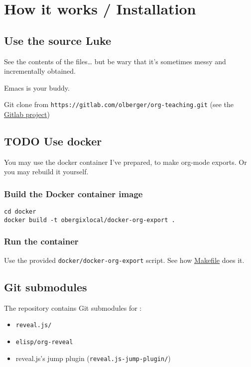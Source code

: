 \documentclass[a4paper]{article}
\begin{document}
\section{How it works / Installation}
\label{sec:orga153eb7}
\subsection{Use the source Luke}
\label{sec:org9c9aba3}

See the contents of the files\ldots{} but be wary that it's sometimes messy and incrementally obtained.

Emacs is your buddy.

Git clone from \texttt{https://gitlab.com/olberger/org-teaching.git} (see the \href{https://gitlab.com/olberger/org-teaching}{Gitlab project})

\subsection{{\bfseries\sffamily TODO} Use docker}
\label{sec:org5980885}

You may use the docker container I've prepared, to make org-mode
exports. Or you may rebuild it yourself.

\subsubsection{Build the Docker container image}
\label{sec:org3220307}

\begin{verbatim}
cd docker
docker build -t obergixlocal/docker-org-export .
\end{verbatim}

\subsubsection{Run the container}
\label{sec:org0a073fd}

Use the provided \texttt{docker/docker-org-export} script. See how \url{Makefile} does it.

\subsection{Git submodules}
\label{sec:orgc0120be}

The repository contains Git submodules for :
\begin{itemize}
\item \texttt{reveal.js/}
\item \texttt{elisp/org-reveal}
\item reveal.js's jump plugin (\texttt{reveal.js-jump-plugin/})
\end{itemize}
\end{document}
